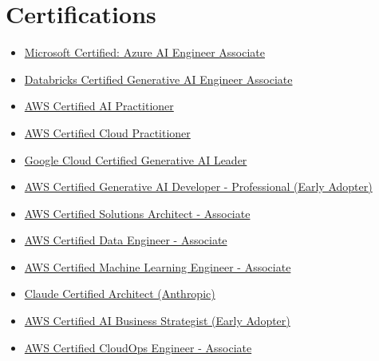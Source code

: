 \documentclass[11pt,a4paper]{article}
\begin{document}
\section*{Certifications}
\begin{itemize}[noitemsep]
    \item \href{https://learn.microsoft.com/en-us/credentials/certifications/azure-ai-engineer/?practice-assessment-type=certification}{Microsoft Certified: Azure AI Engineer Associate}
    \item \href{https://www.databricks.com/learn/certification/genai-engineer-associate}{Databricks Certified Generative AI Engineer Associate}
    \item \href{https://cp.certmetrics.com/amazon/en/public/verify/credential/c65b03c602824a3882728a0959bfa442}{AWS Certified AI Practitioner}
    \item \href{https://cp.certmetrics.com/amazon/en/public/verify/credential/7473958a3e3c4a89a8d4ae4dc728e9c8}{AWS Certified Cloud Practitioner}
    \item \href{https://www.credly.com/badges/751e21c8-04bf-4675-ac73-df0dd2d12fb2/public_url}{Google Cloud Certified Generative AI Leader}
    \item \href{https://cp.certmetrics.com/amazon/en/public/verify/credential/4816e29b3059438d802f7fdba5794aaf}{AWS Certified Generative AI Developer - Professional (Early Adopter)}
    \item \href{https://www.credly.com/badges/554711ac-86dd-495c-a951-0f035c19bcd5/public_url}{AWS Certified Solutions Architect - Associate}
    \item \href{https://www.credly.com/badges/4eff56c6-e62d-48eb-b348-d3140f6dda59/public_url}{AWS Certified Data Engineer - Associate}
    \item \href{https://www.credly.com/badges/02748f5d-db90-449d-aff3-fa3cbc74c278/public_url}{AWS Certified Machine Learning Engineer - Associate}
    \item \href{https://verify.skilljar.com/c/dxvknvqkm8c4}{Claude Certified Architect (Anthropic)}
    \item \href{https://www.credly.com/badges/70d82f9e-2749-4c5e-89ee-a45ed2a97313/public_url}{AWS Certified AI Business Strategist (Early Adopter)}
    \item \href{https://www.credly.com/badges/51bb41c1-da34-4d23-93b9-72b9b5617e11/public_url}{AWS Certified CloudOps Engineer - Associate}
\end{itemize}
\end{document}
